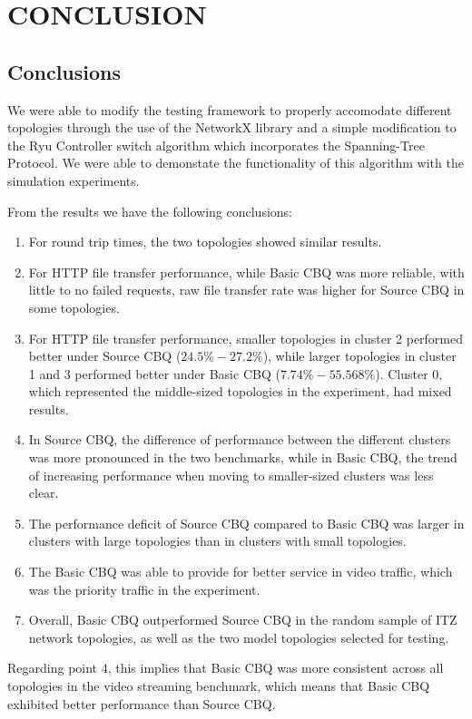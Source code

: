\chapter{CONCLUSION}
\section{Conclusions}

We were able to modify the testing framework to properly accomodate different topologies through the use of the NetworkX library and a simple modification to the Ryu Controller switch algorithm which incorporates the Spanning-Tree Protocol. We were able to demonstate the functionality of this algorithm with the simulation experiments.

From the results we have the following conclusions:
\begin{enumerate}
    \item For round trip times, the two topologies showed similar results. 
    \item For HTTP file transfer performance, while Basic CBQ was more reliable, with little to no failed requests, raw file transfer rate was higher for Source CBQ in some topologies. 
    \item For HTTP file transfer performance, smaller topologies in cluster 2 performed better under Source CBQ ($24.5\%-27.2\%$), while larger topologies in cluster 1 and 3 performed better under Basic CBQ ($7.74\%-55.568\%$). Cluster 0, which represented the middle-sized topologies in the experiment, had mixed results.
    \item In Source CBQ, the difference of performance between the different clusters was more pronounced in the two benchmarks, while in Basic CBQ, the trend of increasing performance when moving to smaller-sized clusters was less clear.
    \item The performance deficit of Source CBQ compared to Basic CBQ was larger in clusters with large topologies than in clusters with small topologies.
    \item The Basic CBQ was able to provide for better service in video traffic, which was the priority traffic in the experiment.
    \item Overall, Basic CBQ outperformed Source CBQ in the random sample of ITZ network topologies, as well as the two model topologies selected for testing. 
\end{enumerate}
Regarding point 4, this implies that Basic CBQ was more consistent across all topologies in the video streaming benchmark, which means that Basic CBQ exhibited better performance than Source CBQ.

